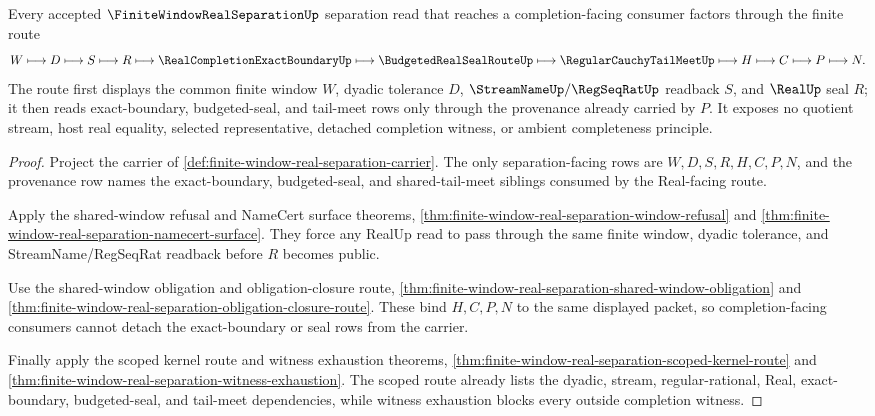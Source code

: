 \begin{theorem}
\label{thm:finite-window-real-separation-scoped-completion-route}
Every accepted $\FiniteWindowRealSeparationUp$ separation read that reaches a completion-facing consumer factors through the finite route
$$
W \longmapsto D \longmapsto S \longmapsto R \longmapsto
\RealCompletionExactBoundaryUp \longmapsto
\BudgetedRealSealRouteUp \longmapsto
\RegularCauchyTailMeetUp \longmapsto H \longmapsto C \longmapsto P \longmapsto N .
$$
The route first displays the common finite window $W$, dyadic tolerance $D$, $\StreamNameUp/\RegSeqRatUp$ readback $S$, and $\RealUp$ seal $R$; it then reads exact-boundary, budgeted-seal, and tail-meet rows only through the provenance already carried by $P$. It exposes no quotient stream, host real equality, selected representative, detached completion witness, or ambient completeness principle.
\end{theorem}
\begin{proof}
Project the carrier of \autoref{def:finite-window-real-separation-carrier}. The only separation-facing rows are $W,D,S,R,H,C,P,N$, and the provenance row names the exact-boundary, budgeted-seal, and shared-tail-meet siblings consumed by the Real-facing route.

Apply the shared-window refusal and NameCert surface theorems, \autoref{thm:finite-window-real-separation-window-refusal} and \autoref{thm:finite-window-real-separation-namecert-surface}. They force any RealUp read to pass through the same finite window, dyadic tolerance, and StreamName/RegSeqRat readback before $R$ becomes public.

Use the shared-window obligation and obligation-closure route, \autoref{thm:finite-window-real-separation-shared-window-obligation} and \autoref{thm:finite-window-real-separation-obligation-closure-route}. These bind $H,C,P,N$ to the same displayed packet, so completion-facing consumers cannot detach the exact-boundary or seal rows from the carrier.

Finally apply the scoped kernel route and witness exhaustion theorems, \autoref{thm:finite-window-real-separation-scoped-kernel-route} and \autoref{thm:finite-window-real-separation-witness-exhaustion}. The scoped route already lists the dyadic, stream, regular-rational, Real, exact-boundary, budgeted-seal, and tail-meet dependencies, while witness exhaustion blocks every outside completion witness.
\end{proof}

